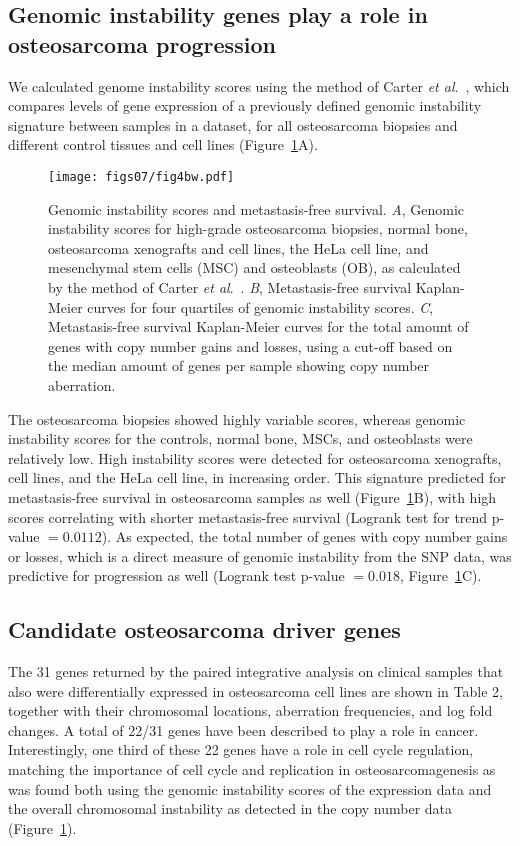 \subsection{Genomic instability genes play a role in osteosarcoma progression}
We calculated genome instability scores using
the method of Carter {\it et al}.~\cite{carter2006signature}, which compares
levels of gene expression of a previously
defined genomic instability signature between
samples in a dataset, for all osteosarcoma biopsies
and different control tissues and cell lines (Figure~\ref{fig7.4}A).
%
\begin{figure}[htbp]
	\centering
	\texttt{[image: figs07/fig4bw.pdf]}	%
	\caption{Genomic instability scores and metastasis\hyp{}free survival. {\it A}, Genomic instability scores for high\hyp{}grade osteosarcoma biopsies, normal bone, osteosarcoma xenografts and cell lines, the HeLa cell line, and mesenchymal stem cells (MSC) and osteoblasts (OB), as calculated by the method of Carter {\it et al}.~\cite{carter2006signature}. {\it B}, Metastasis\hyp{}free survival Kaplan\hyp{}Meier curves for four quartiles of genomic instability scores. {\it C}, Metastasis\hyp{}free survival Kaplan\hyp{}Meier curves for the total amount of genes with copy number gains and losses, using a cut-off based on the median amount of genes per sample showing copy number aberration.}
	\label{fig7.4}
\end{figure}
%
The osteosarcoma biopsies showed highly
variable scores, whereas genomic instability scores
for the controls, normal bone, MSCs, and osteoblasts
were relatively low. High instability scores
were detected for osteosarcoma xenografts, cell
lines, and the HeLa cell line, in increasing order.
This signature predicted for metastasis\hyp{}free survival
in osteosarcoma samples as well (Figure~\ref{fig7.4}B),
with high scores correlating with shorter metastasis\hyp{}free survival (Logrank test for trend p-value $=0.0112$).
As expected, the total number of genes
with copy number gains or losses, which is a direct
measure of genomic instability from the SNP data,
was predictive for progression as well (Logrank
test p-value $=0.018$, Figure~\ref{fig7.4}C).

\subsection{Candidate osteosarcoma driver genes}
The 31 genes returned by the paired integrative
analysis on clinical samples that also were
differentially expressed in osteosarcoma cell lines
are shown in Table 2, together with their chromosomal
locations, aberration frequencies, and
log fold changes. A total of 22/31 genes have
been described to play a role in cancer. Interestingly,
one third of these 22 genes have a role in
cell cycle regulation, matching the importance of
cell cycle and replication in osteosarcomagenesis
as was found both using the genomic instability
scores of the expression data and the overall chromosomal
instability as detected in the copy number
data (Figure~\ref{fig7.4}).

